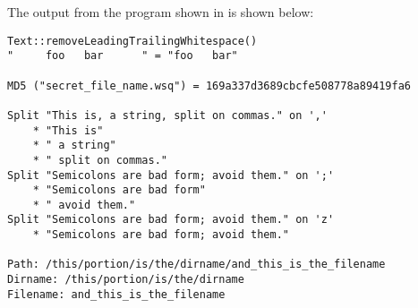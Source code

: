 The output from the program shown in  is shown below:
\begin{verbatim}
Text::removeLeadingTrailingWhitespace()
"     foo   bar      " = "foo   bar"

MD5 ("secret_file_name.wsq") = 169a337d3689cbcfe508778a89419fa6

Split "This is, a string, split on commas." on ','
	* "This is"
	* " a string"
	* " split on commas."
Split "Semicolons are bad form; avoid them." on ';'
	* "Semicolons are bad form"
	* " avoid them."
Split "Semicolons are bad form; avoid them." on 'z'
	* "Semicolons are bad form; avoid them."

Path: /this/portion/is/the/dirname/and_this_is_the_filename
Dirname: /this/portion/is/the/dirname
Filename: and_this_is_the_filename

\end{verbatim}
